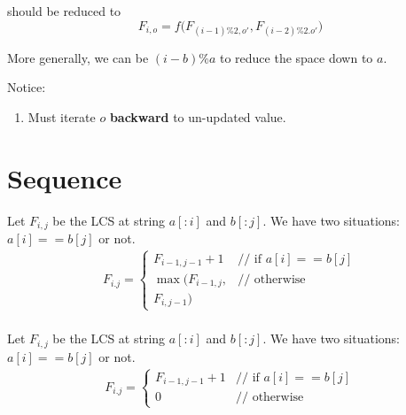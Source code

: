should be reduced to 
$$
F_{i, o} = f\big(F_{(i-1)\%2, o'}, F_{(i-2)\%2. o'}\big)
$$

More generally, we can be $(i-b)\%a$ to reduce the space down to $a$.

Notice:
\begin{enumerate}
\item Must iterate $o$ \textbf{backward} to un-updated value. 
\end{enumerate}



\section{Sequence}\label{dpSequence}
 Let $F_{i, j}$ be the LCS at string $a[:i]$ and $b[:j]$. We have two situations: $a[i]==b[j]$ or not.
\begin{eqnarray*}
F_{i. j} = \left\{ \begin{array}{rl}
  F_{i-1, j-1}+1 &\mbox{// if $a[i]==b[j]$} \\
  \max\Big(F_{i-1, j},&\mbox{// otherwise} \\
  F_{i,j-1}\Big)
       \end{array} \right.
\end{eqnarray*}
\\
 Let $F_{i, j}$ be the LCS at string $a[:i]$ and
$b[:j]$. We have two situations: $a[i]==b[j]$ or not.
\begin{eqnarray*}
F_{i. j} = \left\{ \begin{array}{rl}
  F_{i-1, j-1}+1 &\mbox{// if $a[i]==b[j]$} \\
  0 &\mbox{// otherwise}
       \end{array} \right.
\end{eqnarray*}

